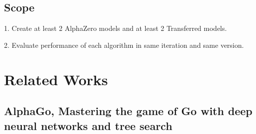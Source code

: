 \documentclass[12pt,a4paper]{article}
\begin{document}
\subsection{Scope}
{
\hspace{0.6cm} 1. Create at least 2 AlphaZero models and at least 2 Transferred models.\par
\hspace{0cm} 2. Evaluate performance of each algorithm in same iteration and same version.
}
\clearpage

\section{Related Works}
\subsection{AlphaGo, Mastering the game of Go with deep neural networks and tree search}
\end{document}
